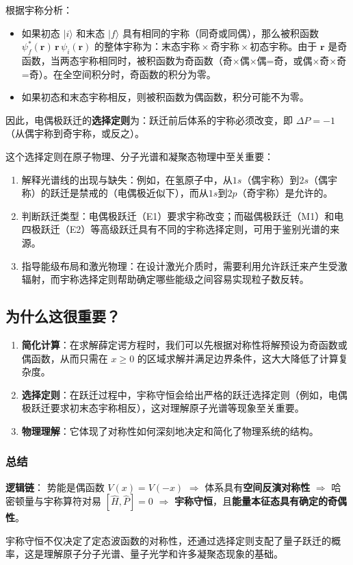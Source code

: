根据宇称分析：
\begin{itemize}
	\item 如果初态 $|i\rangle$ 和末态 $|f\rangle$ 具有相同的宇称（同奇或同偶），那么被积函数 $\psi_f^* (\mathbf{r}) \, \mathbf{r} \, \psi_i(\mathbf{r})$ 的整体宇称为：$\text{末态宇称} \times \text{奇宇称} \times \text{初态宇称}$。由于 $\mathbf{r}$ 是奇函数，当两态宇称相同时，被积函数为奇函数（奇×偶×偶=奇，或偶×奇×奇=奇）。在全空间积分时，奇函数的积分为零。
	\item 如果初态和末态宇称相反，则被积函数为偶函数，积分可能不为零。
\end{itemize}

因此，电偶极跃迁的\textbf{选择定则}为：跃迁前后体系的宇称必须改变，即 $\Delta P = -1$（从偶宇称到奇宇称，或反之）。

这个选择定则在原子物理、分子光谱和凝聚态物理中至关重要：
\begin{enumerate}
	\item 解释光谱线的出现与缺失：例如，在氢原子中，从$1s$（偶宇称）到$2s$（偶宇称）的跃迁是禁戒的（电偶极近似下），而从$1s$到$2p$（奇宇称）是允许的。
	\item 判断跃迁类型：电偶极跃迁（E1）要求宇称改变；而磁偶极跃迁（M1）和电四极跃迁（E2）等高级跃迁具有不同的宇称选择定则，可用于鉴别光谱的来源。
	\item 指导能级布局和激光物理：在设计激光介质时，需要利用允许跃迁来产生受激辐射，而宇称选择定则帮助确定哪些能级之间容易实现粒子数反转。
\end{enumerate}

\subsection{为什么这很重要？}
\begin{enumerate}
	\item \textbf{简化计算}：在求解薛定谔方程时，我们可以先根据对称性将解预设为奇函数或偶函数，从而只需在 $ x \geq 0 $ 的区域求解并满足边界条件，这大大降低了计算复杂度。
	\item \textbf{选择定则}：在跃迁过程中，宇称守恒会给出严格的跃迁选择定则（例如，电偶极跃迁要求初末态宇称相反），这对理解原子光谱等现象至关重要。
	\item \textbf{物理理解}：它体现了对称性如何深刻地决定和简化了物理系统的结构。
\end{enumerate}

\subsubsection*{总结}
\textbf{逻辑链}：
势能是偶函数 $ V(x)=V(-x) $ $\Rightarrow$ 体系具有\textbf{空间反演对称性} $\Rightarrow$ 哈密顿量与宇称算符对易 $ [\hat{H}, \hat{P}]=0 $ $\Rightarrow$ \textbf{宇称守恒}，且\textbf{能量本征态具有确定的奇偶性}。

宇称守恒不仅决定了定态波函数的对称性，还通过选择定则支配了量子跃迁的概率，这是理解原子分子光谱、量子光学和许多凝聚态现象的基础。